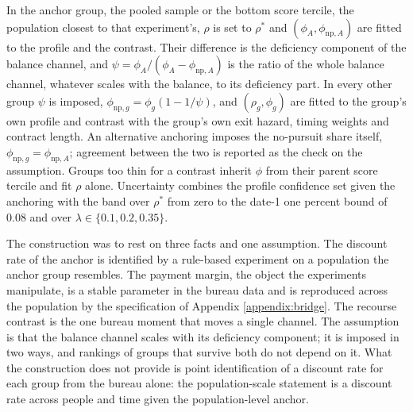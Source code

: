 In the anchor group, the pooled sample or the bottom score tercile, the population closest to that experiment's, $\rho$ is set to $\rho^\ast$ and $(\phi_A, \phi_{\text{np},A})$ are fitted to the profile and the contrast. Their difference is the deficiency component of the balance channel, and $\psi = \phi_A/(\phi_A - \phi_{\text{np},A})$ is the ratio of the whole balance channel, whatever scales with the balance, to its deficiency part. In every other group $\psi$ is imposed, $\phi_{\text{np},g} = \phi_g(1 - 1/\psi)$, and $(\rho_g, \phi_g)$ are fitted to the group's own profile and contrast with the group's own exit hazard, timing weights and contract length. An alternative anchoring imposes the no-pursuit share itself, $\phi_{\text{np},g} = \phi_{\text{np},A}$; agreement between the two is reported as the check on the assumption. Groups too thin for a contrast inherit $\phi$ from their parent score tercile and fit $\rho$ alone. Uncertainty combines the profile confidence set given the anchoring with the band over $\rho^\ast$ from zero to the date-1 one percent bound of $0.08$ and over $\lambda \in \{0.1, 0.2, 0.35\}$.

The construction was to rest on three facts and one assumption. The discount rate of the anchor is identified by a rule-based experiment on a population the anchor group resembles. The payment margin, the object the experiments manipulate, is a stable parameter in the bureau data and is reproduced across the population by the specification of Appendix \ref{appendix:bridge}. The recourse contrast is the one bureau moment that moves a single channel. The assumption is that the balance channel scales with its deficiency component; it is imposed in two ways, and rankings of groups that survive both do not depend on it. What the construction does not provide is point identification of a discount rate for each group from the bureau alone: the population-scale statement is a discount rate across people and time given the population-level anchor.


